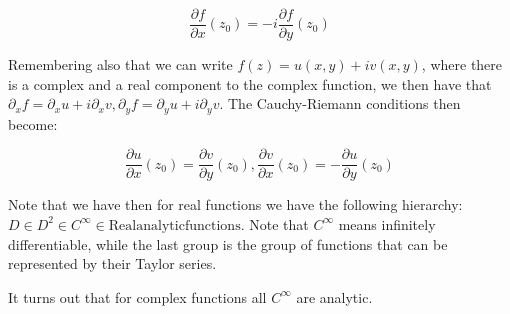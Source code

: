\documentclass{report}
\begin{document}
$$\frac{\partial f}{\partial x}(z_0) = -i\frac{\partial f}{\partial y}(z_0)$$

Remembering also that we can write $f(z) = u(x,y) + iv(x,y)$, where there is a complex and a real component to the complex function, we then have that $\partial_xf = \partial_x u + i\partial_xv, \partial_yf = \partial_yu + i\partial_yv$. The Cauchy-Riemann conditions then become:

$$\frac{\partial u}{\partial x}(z_0) = \frac{\partial v}{\partial y}(z_0), \frac{\partial v}{\partial x}(z_0) = - \frac{\partial u}{\partial y}(z_0)$$

Note that we have then for real functions we have the following hierarchy: $D \in D^2 \in C^\infty \in \mathrm{Real analytic functions}$. Note that $C^\infty$ means infinitely differentiable, while the last group is the group of functions that can be represented by their Taylor series. 

It turns out that for complex functions all $C^{\infty}$ are analytic. 
\end{document}
